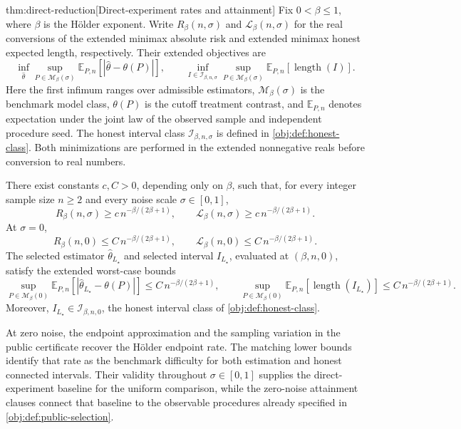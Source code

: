 \begin{theoremv}{thm:direct-reduction}[Direct-experiment rates and attainment]
Fix \(0<\beta\le1\), where \(\beta\) is the Hölder exponent. Write \(R_\beta(n,\sigma)\) and \(\mathcal L_\beta(n,\sigma)\) for the real conversions of the extended minimax absolute risk and extended minimax honest expected length, respectively. Their extended objectives are
\[
\inf_{\widehat\theta}\sup_{P\in\mathcal M_\beta(\sigma)}
\mathbb E_{P,n}\!\left[|\widehat\theta-\theta(P)|\right],
\qquad
\inf_{I\in\mathcal I_{\beta,n,\sigma}}
\sup_{P\in\mathcal M_\beta(\sigma)}
\mathbb E_{P,n}\!\left[\operatorname{length}(I)\right].
\]
Here the first infimum ranges over admissible estimators, \(\mathcal M_\beta(\sigma)\) is the benchmark model class, \(\theta(P)\) is the cutoff treatment contrast, and \(\mathbb E_{P,n}\) denotes expectation under the joint law of the observed sample and independent procedure seed. The honest interval class \(\mathcal I_{\beta,n,\sigma}\) is defined in \cref{obj:def:honest-class}. Both minimizations are performed in the extended nonnegative reals before conversion to real numbers.

There exist constants \(c,C>0\), depending only on \(\beta\), such that, for every integer sample size \(n\ge2\) and every noise scale \(\sigma\in[0,1]\),
\[
R_\beta(n,\sigma)\ge c\,n^{-\beta/(2\beta+1)},
\qquad
\mathcal L_\beta(n,\sigma)\ge c\,n^{-\beta/(2\beta+1)}.
\]
At \(\sigma=0\),
\[
R_\beta(n,0)\le C\,n^{-\beta/(2\beta+1)},
\qquad
\mathcal L_\beta(n,0)\le C\,n^{-\beta/(2\beta+1)}.
\]
The selected estimator \(\widehat\theta_{L_\star}\) and selected interval \(I_{L_\star}\), evaluated at \((\beta,n,0)\), satisfy the extended worst-case bounds
\[
\sup_{P\in\mathcal M_\beta(0)}
\mathbb E_{P,n}\!\left[
|\widehat\theta_{L_\star}-\theta(P)|
\right]
\le C\,n^{-\beta/(2\beta+1)},
\qquad
\sup_{P\in\mathcal M_\beta(0)}
\mathbb E_{P,n}\!\left[
\operatorname{length}(I_{L_\star})
\right]
\le C\,n^{-\beta/(2\beta+1)}.
\]
Moreover, \(I_{L_\star}\in\mathcal I_{\beta,n,0}\), the honest interval class of \cref{obj:def:honest-class}.
\end{theoremv}

At zero noise, the endpoint approximation and the sampling variation in the public certificate recover the Hölder endpoint rate. The matching lower bounds identify that rate as the benchmark difficulty for both estimation and honest connected intervals. Their validity throughout \(\sigma\in[0,1]\) supplies the direct-experiment baseline for the uniform comparison, while the zero-noise attainment clauses connect that baseline to the observable procedures already specified in \cref{obj:def:public-selection}.

